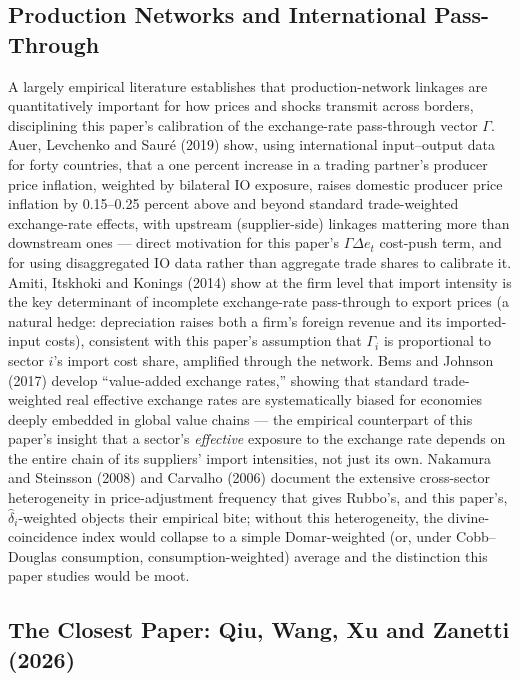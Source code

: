 \documentclass[12pt]{article}
\begin{document}
\subsection{Production Networks and International Pass-Through}

A largely empirical literature establishes that production-network linkages are quantitatively
important for how prices and shocks transmit across borders, disciplining this paper's calibration of
the exchange-rate pass-through vector $\Gamma$. Auer, Levchenko and Sauré (2019) show, using
international input--output data for forty countries, that a one percent increase in a trading
partner's producer price inflation, weighted by bilateral IO exposure, raises domestic producer
price inflation by 0.15--0.25 percent above and beyond standard trade-weighted exchange-rate effects,
with upstream (supplier-side) linkages mattering more than downstream ones --- direct motivation for
this paper's $\Gamma\Delta e_t$ cost-push term, and for using disaggregated IO data rather than
aggregate trade shares to calibrate it. Amiti, Itskhoki and Konings (2014) show at the firm level
that import intensity is the key determinant of incomplete exchange-rate pass-through to export
prices (a natural hedge: depreciation raises both a firm's foreign revenue and its imported-input
costs), consistent with this paper's assumption that $\Gamma_i$ is proportional to sector $i$'s
import cost share, amplified through the network. Bems and Johnson (2017) develop
``value-added exchange rates,'' showing that standard trade-weighted real effective exchange rates
are systematically biased for economies deeply embedded in global value chains --- the empirical
counterpart of this paper's insight that a sector's \emph{effective} exposure to the exchange rate
depends on the entire chain of its suppliers' import intensities, not just its own. Nakamura and
Steinsson (2008) and Carvalho (2006) document the extensive cross-sector heterogeneity in
price-adjustment frequency that gives Rubbo's, and this paper's, $\hat\delta_i$-weighted objects their
empirical bite; without this heterogeneity, the divine-coincidence index would collapse to a simple
Domar-weighted (or, under Cobb--Douglas consumption, consumption-weighted) average and the
distinction this paper studies would be moot.

\subsection{The Closest Paper: Qiu, Wang, Xu and Zanetti (2026)}
\end{document}
